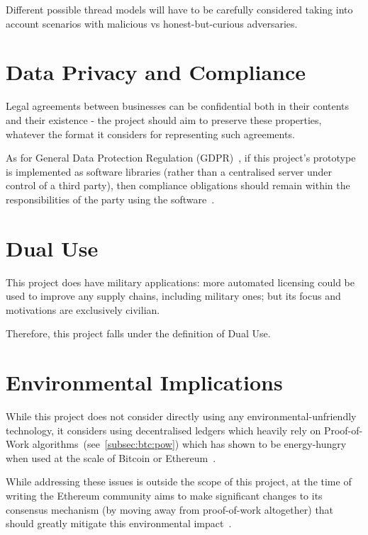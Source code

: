 Different possible thread models will have to be carefully considered taking into account scenarios
with malicious vs honest-but-curious adversaries.


\section{Data Privacy and Compliance}\label{sec:data-privacy-compliance}


Legal agreements between businesses can be confidential both in their contents and their existence -
the project should aim to preserve these properties, whatever the format it considers for
representing such agreements.

As for General Data Protection Regulation (GDPR)~\cite{gdprInfo}, if this project's prototype is
implemented as software libraries (rather than a centralised server under control of a third party),
then compliance obligations should remain within the responsibilities of the party using the
software~\citeTODO.

\section{Dual Use}\label{sec:dual-use}

This project does have military applications: more automated licensing could be used to improve
any supply chains, including military ones;
but its focus and motivations are exclusively civilian.

Therefore, this project falls under the definition of Dual Use.

\section{Environmental Implications}\label{sec:environmental-implications}

While this project does not consider directly using any environmental-unfriendly technology, it
considers using decentralised ledgers which heavily rely on Proof-of-Work
algorithms~(see~\ref{subsec:btc:pow}) which has shown to be energy-hungry when used at the scale of
Bitcoin or Ethereum~\cite{GOODKIND2020101281}.

While addressing these issues is outside the scope of this project, at the time of writing the
Ethereum community aims to make significant changes to its consensus mechanism (by moving away from
proof-of-work altogether) that should greatly mitigate this environmental impact~\cite{eth2Vision}.

